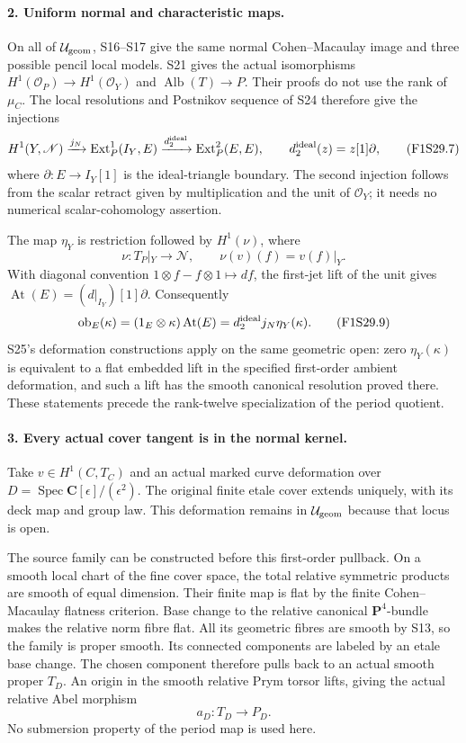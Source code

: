 \paragraph{2. Uniform normal and characteristic maps.}
On all of $\mathcal U_{\rm geom}$, S16--S17 give the same
normal Cohen--Macaulay image and three possible pencil
local models. S21 gives the actual isomorphisms
$H^1(\mathcal O_P)\to H^1(\mathcal O_Y)$ and
$\operatorname{Alb}(T)\to P$. Their proofs do not use
the rank of $\mu_C$. The local resolutions and Postnikov
sequence of S24 therefore give the injections
\[
 H^1(Y,\mathscr N)\xrightarrow{j_N}
 \operatorname{Ext}^1_P(I_Y,E)
   \xrightarrow{d^{\rm ideal}_2}\operatorname{Ext}^2_P(E,E),
 \qquad d^{\rm ideal}_2(z)=z[1]\partial,
 \tag{F1S29.7}
\]
where $\partial:E\to I_Y[1]$ is the ideal-triangle boundary.
The second injection follows from the scalar retract
given by multiplication and the unit of $\mathcal O_Y$;
it needs no numerical scalar-cohomology assertion.

The map $\eta_Y$ is restriction followed by $H^1(\nu)$,
where
\[
 \nu:T_P|_Y\longrightarrow\mathscr N,\qquad
                         \nu(v)(f)=v(f)|_Y.
 \tag{F1S29.8}
\]
With diagonal convention $1\otimes f-f\otimes1\mapsto df$,
the first-jet lift of the unit gives
$\operatorname{At}(E)=(d|_{I_Y})[1]\partial$.
Consequently
\[
 \operatorname{ob}_E(\kappa)
  =(1_E\otimes\kappa)\operatorname{At}(E)
       =d^{\rm ideal}_2j_N\eta_Y(\kappa).
 \tag{F1S29.9}
\]
S25's deformation constructions apply on the same geometric
open: zero $\eta_Y(\kappa)$ is equivalent to a flat embedded
lift in the specified first-order ambient deformation, and
such a lift has the smooth canonical resolution proved there.
These statements precede the rank-twelve specialization
of the period quotient.

\paragraph{3. Every actual cover tangent is in the normal kernel.}
Take $v\in H^1(C,T_C)$ and an actual marked curve deformation
over $D=\operatorname{Spec}\mathbf C[\epsilon]/(\epsilon^2)$.
The original finite etale cover extends uniquely, with its
deck map and group law. This deformation remains in
$\mathcal U_{\rm geom}$ because that locus is open.

The source family can be constructed before this first-order
pullback. On a smooth local chart of the fine cover space,
the total relative symmetric products are smooth of equal
dimension. Their finite map is flat by the finite
Cohen--Macaulay flatness criterion. Base change to the
relative canonical $\mathbf P^4$-bundle makes the relative
norm fibre flat. All its geometric fibres are smooth by S13,
so the family is proper smooth. Its connected components
are labeled by an etale base change. The chosen component
therefore pulls back to an actual smooth proper $T_D$.
An origin in the smooth relative Prym torsor lifts, giving
the actual relative Abel morphism
\[
                          a_D:T_D\longrightarrow P_D.
 \tag{F1S29.10}
\]
No submersion property of the period map is used here.

